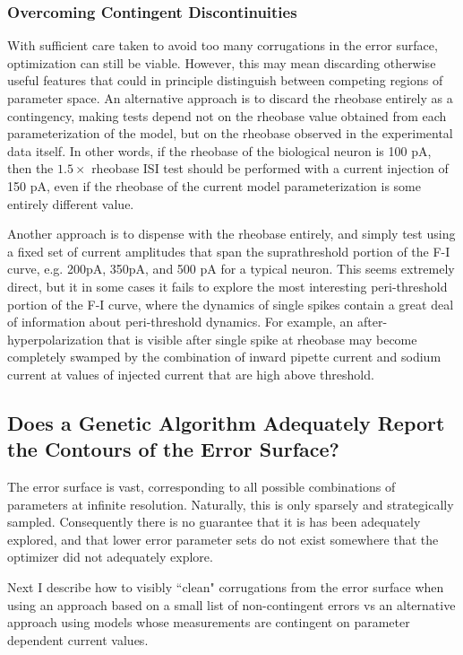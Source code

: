 
\subsubsection{Overcoming Contingent Discontinuities}
With sufficient care taken to avoid too many corrugations in the error surface,  optimization can still be viable.
However, this may mean discarding otherwise useful features that could in principle distinguish between competing regions of parameter space.
An alternative approach is to discard the rheobase entirely as a contingency,
making tests depend not on the rheobase value obtained from each parameterization of the model, but on the rheobase observed in the experimental data itself.
In other words, if the rheobase of the biological neuron is 100 pA, then the $1.5\times$ rheobase ISI test should be performed with a current injection of 150 pA, even if the rheobase of the current model parameterization is some entirely different value.

Another approach is to dispense with the rheobase entirely, and simply test using a fixed set of current amplitudes that span the suprathreshold portion of the F-I curve, e.g. 200pA, 350pA, and 500 pA for a typical neuron.
This seems extremely direct, but it in some cases it fails to explore the most interesting peri-threshold portion of the F-I curve, where the dynamics of single spikes contain a great deal of information about peri-threshold dynamics.
For example, an after-hyperpolarization that is visible after single spike at rheobase may become completely swamped by the combination of inward pipette current and sodium current at values of injected current that are high above threshold.

\subsection{Does a Genetic Algorithm Adequately Report the Contours of the Error Surface?}
The error surface is vast, corresponding to all possible combinations of parameters at infinite resolution.
Naturally, this is only sparsely and strategically sampled.
Consequently there is no guarantee that it is has been adequately explored, and that lower error parameter sets do not exist somewhere that the optimizer did not adequately explore.

Next I describe how to visibly ``clean" corrugations from the error surface when using an approach based on a small list of non-contingent errors vs an alternative approach using models whose measurements are contingent on parameter dependent current values.

